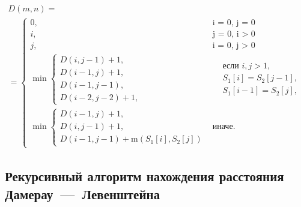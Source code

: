 \begin{multline}
    D(m, n) =\\ =
    \begin{cases}
        0, &\text{i = 0, j = 0}\\
        i, &\text{j = 0, i > 0}\\
        j, &\text{i = 0, j > 0}\\
        \min
        \begin{cases}
            D(i, j - 1) + 1,\\
            D(i - 1, j) + 1,\\
            D(i - 1, j - 1),\\
            D(i - 2, j - 2) + 1,
        \end{cases} 
        &\begin{aligned}
            & \text{если $i, j > 1$}, \\
            & S_{1}[i] = S_{2}[j - 1], \\
            & S_{1}[i - 1] = S_{2}[j],
        \end{aligned} \\
        \min
        \begin{cases}
            D(i - 1, j) + 1, \\
            D(i, j - 1) + 1, \\
            D(i - 1, j - 1) + \text{m}(S_1[i], S_2[j])
        \end{cases} &\text{иначе.}
    \end{cases}
    \label{eqn:recur-damlev}
\end{multline}

\subsection{\texorpdfstring{Рекурсивный алгоритм нахождения расстояния Дамерау~---~Левенштейна}{}}

